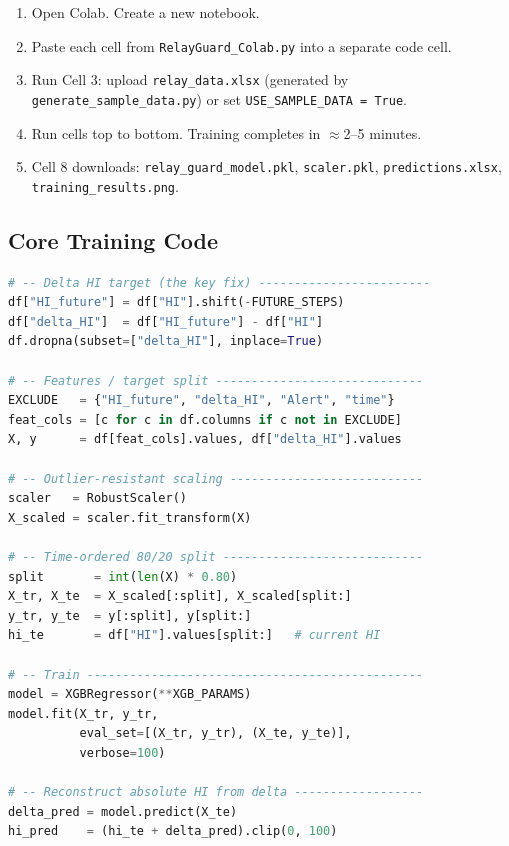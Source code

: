 \documentclass[12pt,a4paper]{article}
\begin{document}
\begin{enumerate}[noitemsep]
  \item Open Colab. Create a new notebook.
  \item Paste each cell from \texttt{RelayGuard\_Colab.py} into a separate code cell.
  \item Run Cell 3: upload \texttt{relay\_data.xlsx} (generated by \texttt{generate\_sample\_data.py}) or set \texttt{USE\_SAMPLE\_DATA = True}.
  \item Run cells top to bottom. Training completes in $\approx$2--5 minutes.
  \item Cell 8 downloads: \texttt{relay\_guard\_model.pkl}, \texttt{scaler.pkl},
        \texttt{predictions.xlsx}, \texttt{training\_results.png}.
\end{enumerate}

\subsection{Core Training Code}

\begin{lstlisting}[language=Python, caption={Delta-HI target creation and XGBoost training (from RelayGuard\_Colab.py).}]
# -- Delta HI target (the key fix) ------------------------
df["HI_future"] = df["HI"].shift(-FUTURE_STEPS)
df["delta_HI"]  = df["HI_future"] - df["HI"]
df.dropna(subset=["delta_HI"], inplace=True)

# -- Features / target split -----------------------------
EXCLUDE   = {"HI_future", "delta_HI", "Alert", "time"}
feat_cols = [c for c in df.columns if c not in EXCLUDE]
X, y      = df[feat_cols].values, df["delta_HI"].values

# -- Outlier-resistant scaling ---------------------------
scaler   = RobustScaler()
X_scaled = scaler.fit_transform(X)

# -- Time-ordered 80/20 split ----------------------------
split       = int(len(X) * 0.80)
X_tr, X_te  = X_scaled[:split], X_scaled[split:]
y_tr, y_te  = y[:split], y[split:]
hi_te       = df["HI"].values[split:]   # current HI

# -- Train -----------------------------------------------
model = XGBRegressor(**XGB_PARAMS)
model.fit(X_tr, y_tr,
          eval_set=[(X_tr, y_tr), (X_te, y_te)],
          verbose=100)

# -- Reconstruct absolute HI from delta ------------------
delta_pred = model.predict(X_te)
hi_pred    = (hi_te + delta_pred).clip(0, 100)
\end{lstlisting}
\end{document}
